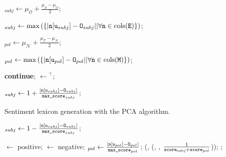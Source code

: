 \begin{algorithm}
\begin{algorithmic}[1]
    \State{}$_{subj}\gets\mu_{\mathcal{O}} + \frac{\mu_{\mathcal{S}} -
    \mu_{\mathcal{O}}}{2}$;

    \State{}$_{subj}\gets\max\left(\{|\vars{n}\lbrack\vars{u}_{subj}\rbrack%
      - \vars{O}_{subj}| |\forall\vars{n}\in\func{cols}(\vars{E})\}\right)$;

    \State{}$_{pol}\gets\mu_{\mathcal{N}} + \frac{\mu_{\mathcal{P}} -
    \mu_{\mathcal{N}}}{2}$;

    \State{}$_{pol}\gets\max\left(\{|\vars{n}\lbrack\vars{u}_{pol}\rbrack%
      - \vars{O}_{pol}| |\forall\vars{n}\in\func{cols}(\vars{M})\}\right)$;

    \State \textbf{continue};
    \EndIf
    \State {}$\gets$$^\top$;


    \State{}$_{subj}\gets 1 + %
    \frac{|\vars{n}\lbrack\vars{u}_{subj}\rbrack - \vars{O}_{subj}|}{\vars{max\_score}_{subj}}$;
  \end{algorithmic}
  \caption[Sentiment lexicon generation using PCA.]{Sentiment lexicon
    generation with the PCA algorithm.}\label{snt:lex:alg:pca}
\end{algorithm}

\begin{algorithm}
  \begin{algorithmic}[1]
    \Else
    \State{}$_{subj}\gets 1 - %
    \frac{|\vars{n}\lbrack\vars{u}_{subj}\rbrack - \vars{O}_{subj}|}{\vars{max\_score}_{subj}}$;
    \EndIf


    \State{}$\gets$ positive;
    \Else
    \State {}$\gets$ negative;
    \EndIf
    \State{}$_{pol}\gets%
    \frac{|\vars{n}\lbrack\vars{u}_{pol}\rbrack %
      - \vars{O}_{pol}|}{\vars{max\_score}_{pol}}$;
    \State{}(,
    (, , %
    $\frac{1}{\texttt{score}_{\textrm{subj}} + \texttt{score}_{pol}}$));
    \Statex{}
    \EndFor
    \State\Return{};
    \EndFunction
  \end{algorithmic}
\end{algorithm}

